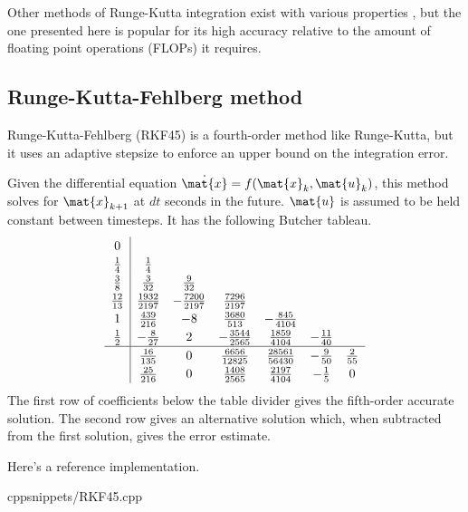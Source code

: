 Other methods of Runge-Kutta integration exist with various properties
\cite{bib:wiki_rk4}, but the one presented here is popular for its high accuracy
relative to the amount of floating point operations (FLOPs) it requires.

\subsection{Runge-Kutta-Fehlberg method}

Runge-Kutta-Fehlberg (RKF45) is a fourth-order method like Runge-Kutta, but it
uses an adaptive stepsize to enforce an upper bound on the integration error.
\begin{theorem}
  Given the differential equation $\dot{\mat{x}} = f(\mat{x}_k, \mat{u}_k)$,
  this method solves for $\mat{x}_{k+1}$ at $dt$ seconds in the future.
  $\mat{u}$ is assumed to be held constant between timesteps. It has the
  following Butcher tableau.
  \begin{equation*}
    \renewcommand\arraystretch{1.2}
    \begin{array}{c|ccccccc}
      0 \\
      \frac{1}{4} & \frac{1}{4} \\
      \frac{3}{8} & \frac{3}{32} & \frac{9}{32} \\
      \frac{12}{13} & \frac{1932}{2197} & -\frac{7200}{2197} & \frac{7296}{2197}
        \\
      1 & \frac{439}{216} & -8 & \frac{3680}{513} & -\frac{845}{4104} \\
      \frac{1}{2} & -\frac{8}{27} & 2 & -\frac{3544}{2565} & \frac{1859}{4104} &
        -\frac{11}{40} \\
      \hline
      & \frac{16}{135} & 0 & \frac{6656}{12825} & \frac{28561}{56430} &
        -\frac{9}{50} & \frac{2}{55} \\
      & \frac{25}{216} & 0 & \frac{1408}{2565} & \frac{2197}{4104} &
        -\frac{1}{5} & 0
    \end{array}
  \end{equation*}
  The first row of coefficients below the table divider gives the fifth-order
  accurate solution. The second row gives an alternative solution which,
  when subtracted from the first solution, gives the error estimate.
\end{theorem}

Here's a reference implementation.
\begin{coderemote}{cpp}{snippets/RKF45.cpp}
  \caption{RKF45 implementation in C++}
\end{coderemote}

